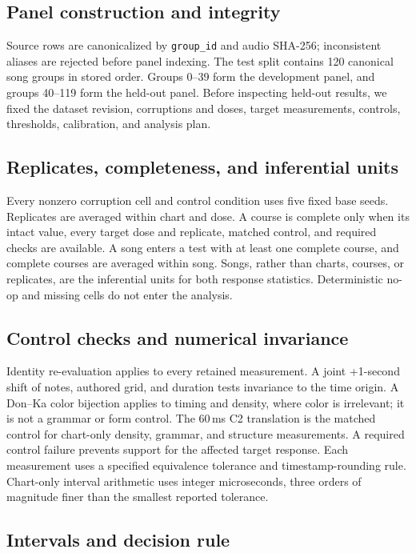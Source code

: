 \documentclass[10pt,twocolumn]{article}
\begin{document}
\subsection{Panel construction and integrity}

Source rows are canonicalized by \texttt{group\_id} and audio SHA-256;
inconsistent aliases are rejected before panel indexing. The test split
contains 120 canonical song groups in stored order. Groups 0--39 form
the development panel, and groups 40--119 form the held-out panel.
Before inspecting held-out results, we fixed the dataset revision,
corruptions and doses, target measurements, controls, thresholds,
calibration, and analysis plan.

\subsection{Replicates, completeness, and inferential units}

Every nonzero corruption cell and control condition uses five fixed base
seeds. Replicates are averaged within chart and dose. A course is
complete only when its intact value, every target
dose and replicate, matched control, and required checks are available. A
song enters a test with at least one complete course, and complete
courses are averaged within song. Songs, rather than charts, courses, or
replicates, are the inferential units for both response statistics.
Deterministic no-op and missing cells do not enter the analysis.

\subsection{Control checks and numerical invariance}

Identity re-evaluation applies to every retained measurement. A joint
+1-second shift of notes, authored grid, and duration tests invariance to
the time origin. A Don--Ka color bijection applies to timing and
density, where color is irrelevant; it is not a grammar or form control.
The 60\,ms C2 translation is the matched control for chart-only density, grammar,
and structure measurements. A required control failure prevents support
for the affected target response. Each measurement uses a specified
equivalence tolerance and timestamp-rounding rule.
Chart-only interval arithmetic uses integer microseconds, three orders
of magnitude finer than the smallest reported tolerance.

\subsection{Intervals and decision rule}
\end{document}
